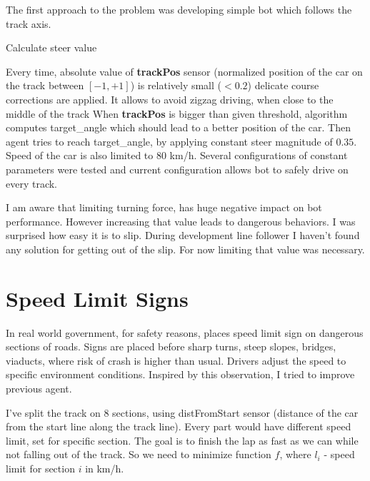\documentclass[declaration,shortabstract,english,inz]{iithesis}
\begin{document}
The first approach to the problem was developing simple bot which follows the track axis.


\begin{algorithm}
    \caption{Calculate steer value}
    \label{alg:steer}
    \begin{algorithmic}
        \ELSE 
        \ENDIF
    \end{algorithmic}
\end{algorithm}

Every time, absolute value of \textbf{trackPos} sensor (normalized position of the car on the track between $ [-1, +1] $) is relatively small ($ < 0.2 $) delicate course corrections are applied. It allows to avoid zigzag driving, when close to the middle of the track
When \textbf{trackPos} is bigger than given threshold, algorithm computes target\_angle which should lead to a better position of the car.
Then agent tries to reach target\_angle, by applying constant steer magnitude of $0.35$.
Speed of the car is also limited to 80 km/h.
Several configurations of constant parameters were tested and current configuration allows bot to safely drive on every track.


I am aware that limiting turning force, has huge negative impact on bot performance.
However increasing that value leads to dangerous behaviors.
I was surprised how easy it is to slip.
During development line follower I haven't found any solution for getting out of the slip.
For now limiting that value was necessary.

\section{Speed Limit Signs}

In real world government, for safety reasons, places speed limit sign on dangerous sections of roads.
Signs are placed before sharp turns, steep slopes, bridges, viaducts, where risk of crash is higher than usual.
Drivers adjust the speed to specific environment conditions.
Inspired by this observation, I tried to improve previous agent.


I've split the track on 8 sections, using distFromStart sensor (distance of the car from the start line along the track line).
Every part would have different speed limit, set for specific section.
The goal is to finish the lap as fast as we can while not falling out of the track.
So we need to minimize function $f$, where $l_i$ - speed limit for section $i$ in km/h.
\end{document}
